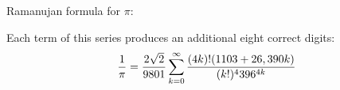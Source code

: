 


 Ramanujan formula for $\pi$:

 Each term of this series produces an additional eight
 correct digits:
                        $$
        {1\over\pi}=
        {2\sqrt 2\over 9801}
        \sum^\infty_{k=0}
                {
          (4k)!(1103+26,390 k)
             \over
             (k!)^4 396^{4k}                        
                 }        $$
\bye

